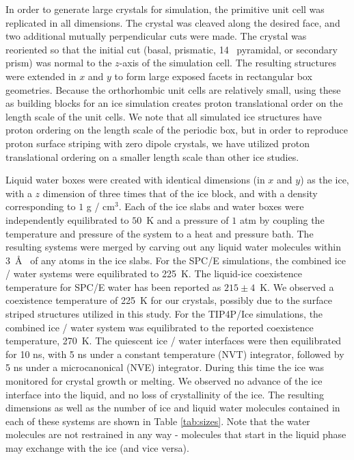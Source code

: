 In order to generate large crystals for simulation, the primitive unit
cell was replicated in all dimensions. The crystal was cleaved along
the desired face, and two additional mutually perpendicular cuts were
made.  The crystal was reoriented so that the initial cut (basal,
prismatic, 14 \degree~pyramidal, or secondary prism) was normal to the
$z$-axis of the simulation cell.  The resulting structures were
extended in $x$ and $y$ to form large exposed facets in rectangular
box geometries.  Because the orthorhombic unit cells are relatively
small, using these as building blocks for an ice simulation creates
proton translational order on the length scale of the unit cells. We
note that all simulated ice structures have proton ordering on the
length scale of the periodic box, but in order to reproduce proton
surface striping with zero dipole crystals, we have utilized proton
translational ordering on a smaller length scale than other ice
studies.

Liquid water boxes were created with identical dimensions (in $x$ and
$y$) as the ice, with a $z$ dimension of three times that of the ice
block, and with a density corresponding to $1$ g / cm$^3$.  Each of
the ice slabs and water boxes were independently equilibrated to
$50$~K and a pressure of $1$ atm by coupling the temperature and
pressure of the system to a heat and pressure bath. The resulting
systems were merged by carving out any liquid water molecules within
3~\AA~ of any atoms in the ice slabs.  For the SPC/E simulations, the
combined ice / water systems were equilibrated to 225~K. The
liquid-ice coexistence temperature for SPC/E water has been reported
as $215 \pm 4$~K.\cite{Vega2006a,Fernandez2006} We observed a
coexistence temperature of 225~K for our crystals, possibly due to the
surface striped structures utilized in this study. For the TIP4P/Ice
simulations, the combined ice / water system was equilibrated to the
reported coexistence temperature, 270~K.\cite{Vega2006a,Fernandez2006}
The quiescent ice / water interfaces were then equilibrated for 10 ns,
with 5 ns under a constant temperature (NVT) integrator, followed by 5
ns under a microcanonical (NVE) integrator.  During this time the ice
was monitored for crystal growth or melting. We observed no advance of
the ice interface into the liquid, and no loss of crystallinity of the
ice. The resulting dimensions as well as the number of ice and liquid
water molecules contained in each of these systems are shown in Table
\ref{tab:sizes}.  Note that the water molecules are not restrained in
any way - molecules that start in the liquid phase may exchange with
the ice (and vice versa).

